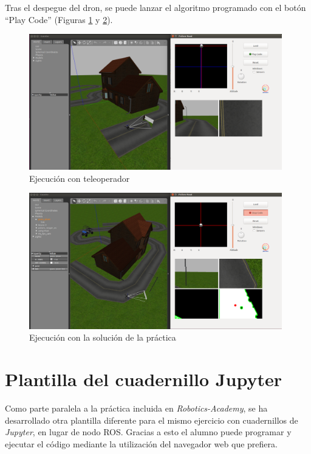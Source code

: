 Tras el despegue del dron, se puede lanzar el algoritmo programado con el botón ``Play Code'' (Figuras \ref{fig.etelfr} y \ref{fig.ealgfr}).

\begin{figure}[H]
  \begin{center}
    \includegraphics[width=0.98\textwidth]{figures/ejec_teleop_fr.png}
		\caption{Ejecución con teleoperador}
		\label{fig.etelfr}
		\end{center}
\end{figure}

\begin{figure}[H]
  \begin{center}
    \includegraphics[width=0.98\textwidth]{figures/ejec_algoritmo_fr.png}
		\caption{Ejecución con la solución de la práctica}
		\label{fig.ealgfr}
		\end{center}
\end{figure}

\section{Plantilla del cuadernillo Jupyter}
Como parte paralela a la práctica incluida en \textit{Robotics-Academy}, se ha desarrollado otra plantilla diferente para el mismo ejercicio con cuadernillos de \textit{Jupyter}, en lugar de nodo ROS. Gracias a esto el alumno puede programar y ejecutar el código mediante la utilización del navegador web que prefiera.

